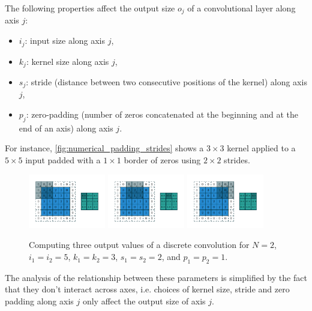 \documentclass{article}
\begin{document}
The following properties affect the output size $o_j$ of a convolutional layer
along axis $j$:

\begin{itemize}
    \item $i_j$: input size along axis $j$,
    \item $k_j$: kernel size along axis $j$,
    \item $s_j$: stride (distance between two consecutive positions of the
        kernel) along axis $j$,
    \item $p_j$: zero-padding (number of zeros concatenated at the beginning and
        at the end of an axis) along axis $j$.
\end{itemize}

For instance, \autoref{fig:numerical_padding_strides} shows a $3 \times 3$
kernel applied to a $5 \times 5$ input padded with a $1 \times 1$ border of
zeros using $2 \times 2$ strides.

\begin{figure}[t]
    \centering
    \includegraphics[width=0.3\textwidth]{pdf/numerical_padding_strides_00.pdf}
    \includegraphics[width=0.3\textwidth]{pdf/numerical_padding_strides_01.pdf}
    \includegraphics[width=0.3\textwidth]{pdf/numerical_padding_strides_02.pdf}
    \caption{\label{fig:numerical_padding_strides} Computing three output values
        of a discrete convolution for $N = 2$, $i_1 = i_2 = 5$, $k_1 = k_2 = 3$,
        $s_1 = s_2 = 2$, and $p_1 = p_2 = 1$.}
\end{figure}

The analysis of the relationship between these parameters is simplified by the
fact that they don't interact across axes, i.e. choices of kernel size, stride
and zero padding along axis $j$ only affect the output size of axis $j$.
\end{document}
